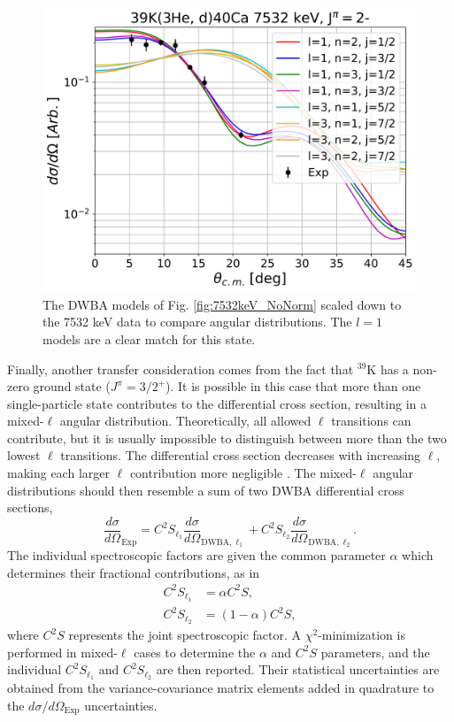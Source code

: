 \begin{figure}[t]
\centering
\includegraphics[width=6.5in]{Chapter-6/figs/7532keV_Norm.png}
\caption{\label{fig:7532keV_Norm}The DWBA models of Fig. \ref{fig:7532keV_NoNorm} scaled down to the 7532 keV data to compare angular distributions. The $l=1$ models are a clear match for this state.}
\end{figure}

Finally, another transfer consideration comes from the fact that $^{39}$K has a non-zero ground state ($J^{\pi} = 3/2^{+}$). It is possible in this case that more than one single-particle state contributes to the differential cross section, resulting in a mixed-$\ell$ angular distribution. Theoretically, all allowed $\ell$ transitions can contribute, but it is usually impossible to distinguish between more than the two lowest $\ell$ transitions. The differential cross section decreases with increasing $\ell$, making each larger $\ell$ contribution more negligible \cite{Hodgson1971}. The mixed-$\ell$ angular distributions should then resemble a sum of two DWBA differential cross sections,
\begin{equation} \label{eqn:mixed_l}
\frac{d\sigma}{d\Omega}_{\mathrm{Exp}} = C^{2}S_{\ell_{1}} \frac{d\sigma}{d\Omega}_{\mathrm{DWBA},\ell_{1}} + C^{2}S_{\ell_{2}} \frac{d\sigma}{d\Omega}_{\mathrm{DWBA},\ell_{2}}.
\end{equation} 
The individual spectroscopic factors are given the common parameter $\alpha$ which determines their fractional contributions, as in
\begin{align}
C^{2}S_{\ell_{1}} &= \alpha C^{2}S, \\
C^{2}S_{\ell_{2}} &= (1 - \alpha) C^{2}S,
\end{align}
where $C^{2}S$ represents the joint spectroscopic factor. A $\chi^{2}$-minimization is performed in mixed-$\ell$ cases to determine the $\alpha$ and $C^{2}S$ parameters, and the individual $C^{2}S_{\ell_{1}}$ and $C^{2}S_{\ell_{2}}$ are then reported. Their statistical uncertainties are obtained from the variance-covariance matrix elements added in quadrature to the $d\sigma/d\Omega_{\mathrm{Exp}}$ uncertainties.

